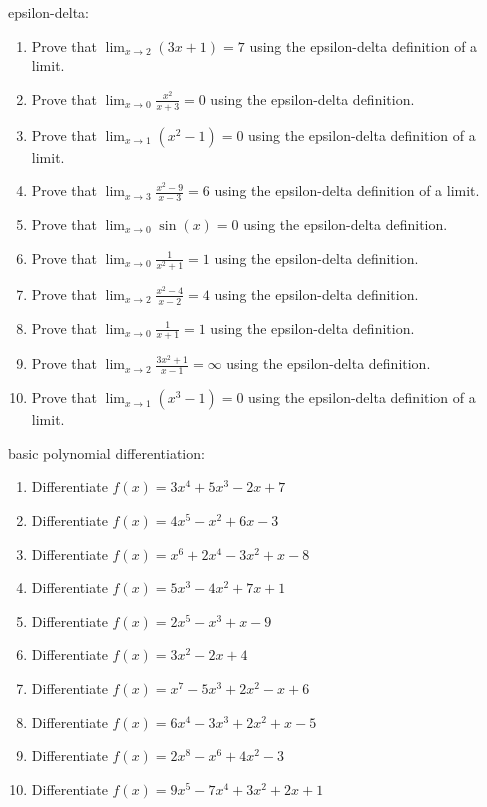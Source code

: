 \documentclass{article}
\begin{document}
epsilon-delta:
\begin{enumerate}
        \item Prove that $\lim_{x \to 2} (3x + 1) = 7$ using the epsilon-delta definition of a limit.
        \item Prove that $\lim_{x \to 0} \frac{x^2}{x + 3} = 0$ using the epsilon-delta definition.
        \item Prove that $\lim_{x \to 1} (x^2 - 1) = 0$ using the epsilon-delta definition of a limit.
        \item Prove that $\lim_{x \to 3} \frac{x^2 - 9}{x - 3} = 6$ using the epsilon-delta definition of a limit.
        \item Prove that $\lim_{x \to 0} \sin(x) = 0$ using the epsilon-delta definition.
        \item Prove that $\lim_{x \to 0} \frac{1}{x^2 + 1} = 1$ using the epsilon-delta definition.
        \item Prove that $\lim_{x \to 2} \frac{x^2 - 4}{x - 2} = 4$ using the epsilon-delta definition.
        \item Prove that $\lim_{x \to 0} \frac{1}{x + 1} = 1$ using the epsilon-delta definition.
        \item Prove that $\lim_{x \to 2} \frac{3x^2 + 1}{x - 1} = \infty$ using the epsilon-delta definition.
        \item Prove that $\lim_{x \to 1} (x^3 - 1) = 0$ using the epsilon-delta definition of a limit.
\end{enumerate}

basic polynomial differentiation:
\begin{enumerate}
        \item Differentiate $f(x) = 3x^4 + 5x^3 - 2x + 7$
        \item Differentiate $f(x) = 4x^5 - x^2 + 6x - 3$
        \item Differentiate $f(x) = x^6 + 2x^4 - 3x^2 + x - 8$
        \item Differentiate $f(x) = 5x^3 - 4x^2 + 7x + 1$
        \item Differentiate $f(x) = 2x^5 - x^3 + x - 9$
        \item Differentiate $f(x) = 3x^2 - 2x + 4$
        \item Differentiate $f(x) = x^7 - 5x^3 + 2x^2 - x + 6$
        \item Differentiate $f(x) = 6x^4 - 3x^3 + 2x^2 + x - 5$
        \item Differentiate $f(x) = 2x^8 - x^6 + 4x^2 - 3$
        \item Differentiate $f(x) = 9x^5 - 7x^4 + 3x^2 + 2x + 1$
\end{enumerate}
\end{document}
